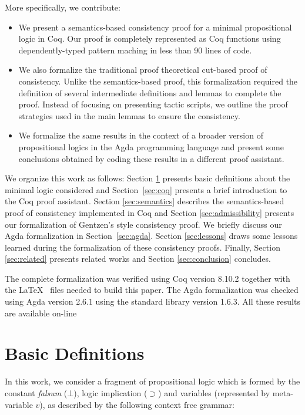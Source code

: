 More specifically, we contribute:


\begin{itemize}
   \item We present a semantics-based consistency proof for a minimal propositional logic in Coq.
   Our proof is completely represented as Coq functions using dependently-typed pattern maching
   in less than 90 lines of code.
   \item We also formalize the traditional proof theoretical cut-based proof of consistency. Unlike the semantics-based
   proof, this formalization required the definition of several intermediate definitions and lemmas to complete the proof.
   Instead of focusing on presenting tactic scripts, we outline the proof strategies used in the main lemmas to ensure
   the consistency.
   \item We formalize the same results in the context of a broader version of propositional logics in the Agda
   programming language and present some conclusions obtained by coding these results in a different proof assistant.
\end{itemize}


We organize this work as follows: Section \ref{sec:definitions} presents basic definitions
about the minimal logic considered and Section~\ref{sec:coq} presents a brief introduction to the Coq proof assistant.
Section \ref{sec:semantics} describes the semantics-based proof of consistency
implemented in  Coq and Section \ref{sec:admissibility} presents our formalization of Gentzen's style consistency proof.
We briefly discuss our Agda formalization in Section~\ref{sec:agda}.
Section \ref{sec:lessons} draws some lessons learned during the formalization of these consistency proofs.
Finally, Section \ref{sec:related} presents related works and Section \ref{sec:conclusion} concludes.


The complete formalization was verified using Coq version 8.10.2  together with the \LaTeX~ files
needed to build this paper. The Agda formalization was checked using Agda version 2.6.1 using the
standard library version 1.6.3. All these results are available on-line~\cite{Sasdelli20}


\section{Basic Definitions}\label{sec:definitions}


In this work, we consider a fragment of propositional logic which is formed by the constant
\emph{falsum} ($\bot$), logic implication ($\supset$) and variables (represented by meta-variable $v$), as
described by the following context free grammar:


